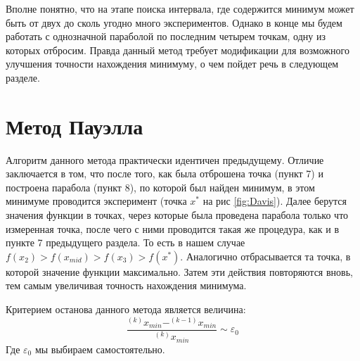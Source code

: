 Вполне понятно, что на этапе поиска интервала, где содержится минимум может быть от двух до сколь угодно много экспериментов. Однако в конце мы будем работать с однозначной параболой по последним четырем точкам, одну из которых отбросим. Правда данный метод требует модификации для возможного улучшения точности нахождения минимуму, о чем пойдет речь в следующем разделе.
\section{Метод Пауэлла}
Алгоритм данного метода практически идентичен предыдущему. Отличие заключается в том, что после того, как была отброшена точка (пункт 7) и построена парабола (пункт 8), по которой был найден минимум, в этом минимуме проводится эксперимент (точка $x^*$ на рис \ref{fig:Davis}). Далее берутся значения функции в точках, через которые была проведена парабола только что измеренная точка, после чего с ними проводится такая же процедура, как и в пункте 7 предыдущего раздела. То есть в нашем случае $f(x_2) > f(x_{mid}) > f(x_3) > f(x^*)$. Аналогично отбрасывается та точка, в которой значение функции максимально. Затем эти действия повторяются вновь, тем самым увеличивая точность нахождения минимума.

Критерием останова данного метода является величина:
\begin{equation}
    \frac{^{(k)}x_{min} - ^{(k-1)}x_{min}}{^{(k)}x_{min}} \sim \varepsilon_0
\end{equation}
Где $\varepsilon_0$ мы выбираем самостоятельно.
